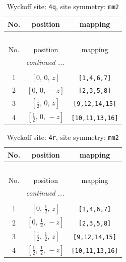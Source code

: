 \documentclass[fleqn,8pt]{jsarticle}
\begin{document}
\renewcommand{\arraystretch}{1.2}
\begin{longtable}{ccc}
\caption{Wyckoff site: {\tt 4q}, site symmetry: {\tt mm2}}
 \\
 \hline \hline
No. & position & mapping \\ \hline \endfirsthead

\multicolumn{2}{l}{\tablename\ \thetable{}} \\
 \hline \hline
No. & position & mapping \\ \hline \endhead

 \hline \hline
\multicolumn{2}{r}{\footnotesize\it continued ...} \\ \endfoot

 \hline \hline
\multicolumn{2}{r}{} \\ \endlastfoot

1 & $\left[ 0,\, 0,\, z \right]$ & {\tt [1,4,6,7]} \\ \hline
2 & $\left[ 0,\, 0,\, - z \right]$ & {\tt [2,3,5,8]} \\ \hline
3 & $\left[ \frac{1}{2},\, 0,\, z \right]$ & {\tt [9,12,14,15]} \\ \hline
4 & $\left[ \frac{1}{2},\, 0,\, - z \right]$ & {\tt [10,11,13,16]} \\
\end{longtable}
\renewcommand{\arraystretch}{1.2}
\begin{longtable}{ccc}
\caption{Wyckoff site: {\tt 4r}, site symmetry: {\tt mm2}}
 \\
 \hline \hline
No. & position & mapping \\ \hline \endfirsthead

\multicolumn{2}{l}{\tablename\ \thetable{}} \\
 \hline \hline
No. & position & mapping \\ \hline \endhead

 \hline \hline
\multicolumn{2}{r}{\footnotesize\it continued ...} \\ \endfoot

 \hline \hline
\multicolumn{2}{r}{} \\ \endlastfoot

1 & $\left[ 0,\, \frac{1}{2},\, z \right]$ & {\tt [1,4,6,7]} \\ \hline
2 & $\left[ 0,\, \frac{1}{2},\, - z \right]$ & {\tt [2,3,5,8]} \\ \hline
3 & $\left[ \frac{1}{2},\, \frac{1}{2},\, z \right]$ & {\tt [9,12,14,15]} \\ \hline
4 & $\left[ \frac{1}{2},\, \frac{1}{2},\, - z \right]$ & {\tt [10,11,13,16]} \\
\end{longtable}
\end{document}
